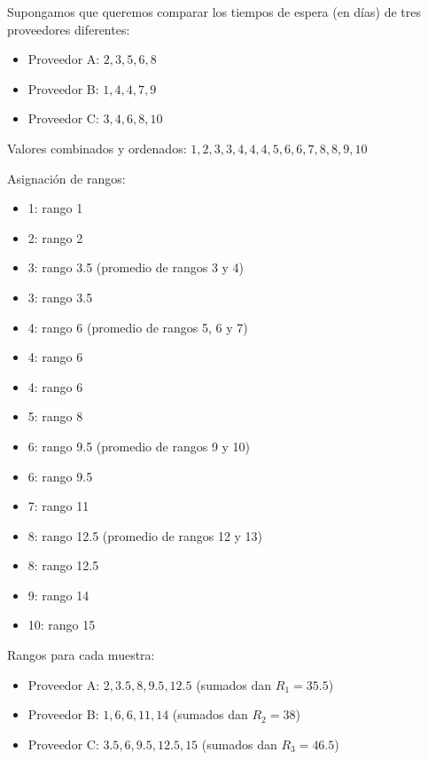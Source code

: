 \documentclass[
  letterpaper,
  DIV=11,
  numbers=noendperiod]{scrreprt}
\providecommand{\tightlist}{%
  \setlength{\itemsep}{0pt}\setlength{\parskip}{0pt}}\usepackage{longtable,booktabs,array}
\begin{document}
\begin{tcolorbox}[enhanced jigsaw, arc=.35mm, breakable, coltitle=black, left=2mm, opacityback=0, bottomtitle=1mm, colbacktitle=quarto-callout-tip-color!10!white, title=\textcolor{quarto-callout-tip-color}{\faLightbulb}\hspace{0.5em}{Ejemplo Práctico. Prueba Kruskal-Wallis}, titlerule=0mm, colback=white, colframe=quarto-callout-tip-color-frame, bottomrule=.15mm, rightrule=.15mm, opacitybacktitle=0.6, toptitle=1mm, toprule=.15mm, leftrule=.75mm]

Supongamos que queremos comparar los tiempos de espera (en días) de tres
proveedores diferentes:

\begin{itemize}
\tightlist
\item
  Proveedor A: \(2, 3, 5, 6, 8\)
\item
  Proveedor B: \(1, 4, 4, 7, 9\)
\item
  Proveedor C: \(3, 4, 6, 8, 10\)
\end{itemize}

Valores combinados y ordenados:
\(1, 2, 3, 3, 4, 4, 4, 5, 6, 6, 7, 8, 8, 9, 10\)

Asignación de rangos:

\begin{itemize}
\tightlist
\item
  1: rango 1
\item
  2: rango 2
\item
  3: rango 3.5 (promedio de rangos 3 y 4)
\item
  3: rango 3.5
\item
  4: rango 6 (promedio de rangos 5, 6 y 7)
\item
  4: rango 6
\item
  4: rango 6
\item
  5: rango 8
\item
  6: rango 9.5 (promedio de rangos 9 y 10)
\item
  6: rango 9.5
\item
  7: rango 11
\item
  8: rango 12.5 (promedio de rangos 12 y 13)
\item
  8: rango 12.5
\item
  9: rango 14
\item
  10: rango 15
\end{itemize}

Rangos para cada muestra:

\begin{itemize}
\tightlist
\item
  Proveedor A: \(2, 3.5, 8, 9.5, 12.5\) (sumados dan \(R_1 = 35.5\))
\item
  Proveedor B: \(1, 6, 6, 11, 14\) (sumados dan \(R_2 = 38\))
\item
  Proveedor C: \(3.5, 6, 9.5, 12.5, 15\) (sumados dan \(R_3 = 46.5\))
\end{itemize}


\end{tcolorbox}
\end{document}
